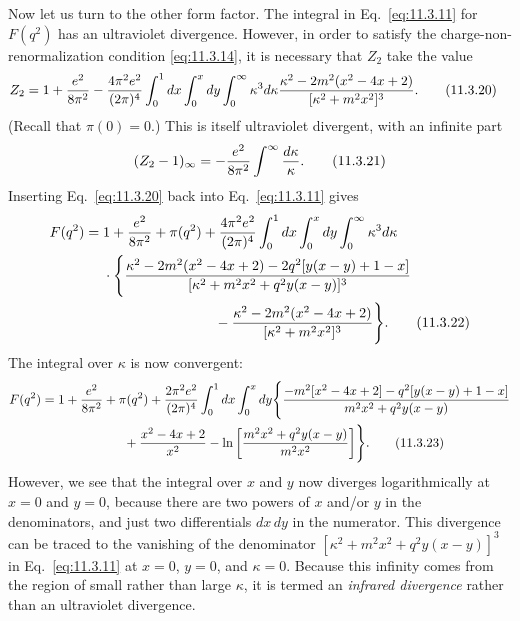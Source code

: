 Now let us turn to the other form factor. The integral in Eq.~\eqref{eq:11.3.11} for
$F(q^2)$ has an ultraviolet divergence. However, in order to satisfy the
charge-non-renormalization condition \eqref{eq:11.3.14}, it is necessary that $Z_2$
take the value
\begin{align}
Z_2={}&1+{e^2\over8\pi^2}-{4\pi^2e^2\over(2\pi)^4}
 \int_0^1dx\int_0^xdy\int_0^\infty\kappa^3d\kappa
 {\kappa^2-2m^2(x^2-4x+2)\over[\kappa^2+m^2x^2]^3}.
\tag{11.3.20}\label{eq:11.3.20}
\end{align}
(Recall that $\pi(0)=0$.) This is itself ultraviolet divergent, with an
infinite part
\begin{equation}
(Z_2-1)_\infty=-{e^2\over8\pi^2}\int^\infty{d\kappa\over\kappa}.
\tag{11.3.21}\label{eq:11.3.21}
\end{equation}
Inserting Eq.~\eqref{eq:11.3.20} back into Eq.~\eqref{eq:11.3.11} gives
\begin{align}
F(q^2)={}&1+{e^2\over8\pi^2}+\pi(q^2)
 +{4\pi^2e^2\over(2\pi)^4}\int_0^1dx\int_0^xdy
 \int_0^\infty\kappa^3d\kappa\notag\\
&\cdot\Biggl\{{\kappa^2-2m^2(x^2-4x+2)
 -2q^2[y(x-y)+1-x]\over[\kappa^2+m^2x^2+q^2y(x-y)]^3}
\notag\\
&\hspace{28mm}-{\kappa^2-2m^2(x^2-4x+2)
 \over[\kappa^2+m^2x^2]^3}\Biggr\}.
\tag{11.3.22}\label{eq:11.3.22}
\end{align}
The integral over $\kappa$ is now convergent:
\begin{align}
F(q^2)={}&1+{e^2\over8\pi^2}+\pi(q^2)
 +{2\pi^2e^2\over(2\pi)^4}\int_0^1dx\int_0^xdy
 \Biggl\{{-m^2[x^2-4x+2]-q^2[y(x-y)+1-x]
 \over m^2x^2+q^2y(x-y)}\notag\\
&\hspace{18mm}+{x^2-4x+2\over x^2}
 -\ln\left[{m^2x^2+q^2y(x-y)\over m^2x^2}\right]\Biggr\}.
\tag{11.3.23}\label{eq:11.3.23}
\end{align}
However, we see that the integral over $x$ and $y$ now diverges
logarithmically at $x=0$ and $y=0$, because there are two powers of $x$
and/or $y$ in the denominators, and just two differentials $dx\,dy$ in the
numerator. This divergence can be traced to the vanishing of the denominator
$[\kappa^2+m^2x^2+q^2y(x-y)]^3$ in Eq.~\eqref{eq:11.3.11} at $x=0$, $y=0$, and
$\kappa=0$. Because this infinity comes from the region of small rather than
large $\kappa$, it is termed an \emph{infrared divergence} rather than an
ultraviolet divergence.

